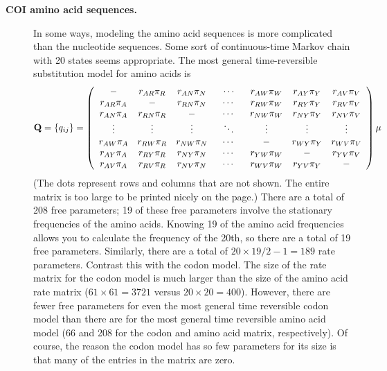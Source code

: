\documentclass{svmult}
\begin{document}
\begin{description}
\item[ {\bf COI amino acid sequences.}] In some ways, modeling the amino acid sequences is more complicated than the nucleotide sequences. 
Some sort of continuous-time Markov chain with 20 states seems appropriate. The most general time-reversible substitution model for amino acids is
\begin{equation*}
{\mathbf Q} = \{q_{ij}\} = \left( \begin{array}{ccccccc}
-                       &  r_{AR} \pi_R  & r_{AN} \pi_N  & \hspace{0.1in} \cdots \hspace{0.1in} &  r_{AW} \pi_W &  r_{AY} \pi_Y &  r_{AV} \pi_V \\
r_{AR} \pi_A  &  -                       & r_{RN} \pi_N  & \cdots &  r_{RW} \pi_W &  r_{RY} \pi_Y &  r_{RV} \pi_V \\
r_{AN} \pi_A  &  r_{RN} \pi_R & -                        & \cdots &  r_{NW} \pi_W &  r_{NY} \pi_Y &  r_{NV} \pi_V \\
\vdots              & \vdots              & \vdots               & \ddots & \vdots               & \vdots             & \vdots              \\
r_{AW} \pi_A &  r_{RW} \pi_R & r_{NW} \pi_N & \cdots &  -                        &  r_{WY} \pi_Y &  r_{WV} \pi_V \\
r_{AY} \pi_A  &  r_{RY} \pi_R  & r_{NY} \pi_N  & \cdots &  r_{YW} \pi_W  &  -                      &  r_{YV} \pi_V \\
r_{AV} \pi_A  &  r_{RV} \pi_R  & r_{NV} \pi_N  & \cdots &  r_{WV} \pi_W  &  r_{YV} \pi_Y &  -                     \\
\end{array} \right) \mu
\end{equation*}
(The dots represent rows and columns that are not shown. The entire matrix is too large to be printed nicely on the page.) There are a total of 208 free parameters;
19 of these free parameters involve the stationary frequencies of the amino acids. Knowing 19 of the amino acid frequencies allows you to calculate the frequency
of the 20th, so there are a total of 19 free parameters. Similarly, there are a total of $20 \times 19 / 2 - 1 = 189$ rate parameters. 
Contrast this with the codon model. The size of the rate matrix for the codon model is much larger than the size of the amino acid rate matrix 
($61 \times 61 = 3721$ versus $20 \times 20 = 400$). However, there are fewer free parameters for even the most general time reversible codon model
than there are for the most general time reversible amino acid model (66 and 208 for the codon and amino acid matrix, respectively). Of course, the reason the codon
model has so few parameters for its size is that many of the entries in the matrix are zero.\\


\end{description}
\end{document}
